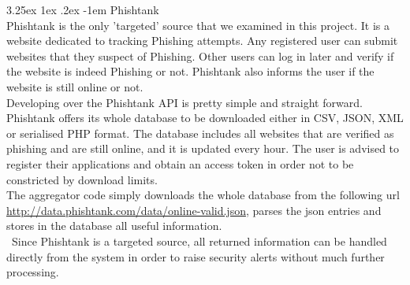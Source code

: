 \documentclass[12pt]{article}
\makeatletter
\renewcommand\paragraph{\@startsection{paragraph}{5}{\z@}%
  {3.25ex \@plus1ex \@minus.2ex}%
  {-1em}%
  {\normalfont\normalsize\bfseries}}
\makeatother
\begin{document}
\paragraph{Phishtank}
\hfill \break\\
Phishtank is the only 'targeted' source that we examined in this project. It is a website dedicated to tracking Phishing attempts. Any registered user can submit websites that they suspect of Phishing. Other users can log in later and verify if the website is indeed Phishing or not. Phishtank also informs the user if the website is still online or not.
\hfill \break\\
Developing over the Phishtank API is pretty simple and straight forward. Phishtank offers its whole database to be downloaded either in CSV, JSON, XML or serialised PHP format. The database includes all websites that are verified as phishing and are still online, and it is updated every hour. The user is advised to register their applications and obtain an access token in order not to be constricted by download limits.
\hfill \break\\
The aggregator code simply downloads the whole database from the following url \url{http://data.phishtank.com/data/online-valid.json}, parses the json entries and stores in the database all useful information. 
\hfill \break\\\
Since Phishtank is a targeted source, all returned information can be handled directly from the system in order to raise security alerts without much further processing. 
 
\end{document}
